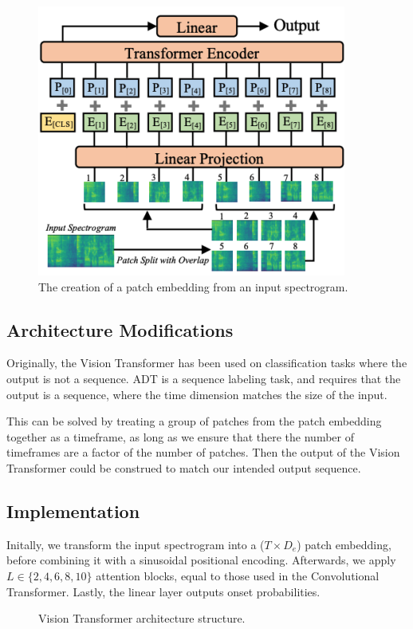 \begin{figure}[H]
    \centering
    \includegraphics[trim=0 0 0 132, clip, scale=0.7]{figures/patchembedding.png}
    \caption{The creation of a patch embedding from an input spectrogram.}
    \label{PatchEmbeddingFigure}
\end{figure}

\subsection{Architecture Modifications}

Originally, the Vision Transformer has been used on classification tasks where the output is not a sequence. \gls{ADT} is a sequence labeling task, and requires that the output is a sequence, where the time dimension matches the size of the input.

This can be solved by treating a group of patches from the patch embedding together as a timeframe, as long as we ensure that there the number of timeframes are a factor of the number of patches. Then the output of the Vision Transformer could be construed to match our intended output sequence.

\subsection{Implementation}

Initally, we transform the input spectrogram into a ($T \times D_e$) patch embedding, before combining it with a sinusoidal positional encoding. Afterwards, we apply $L \in \{2, 4, 6, 8, 10\}$ attention blocks, equal to those used in the Convolutional Transformer. Lastly, the linear layer outputs onset probabilities.

\begin{figure}[H]
    \centering
    
    \caption{Vision Transformer architecture structure.}
    \label{ViTFigure}
\end{figure}
